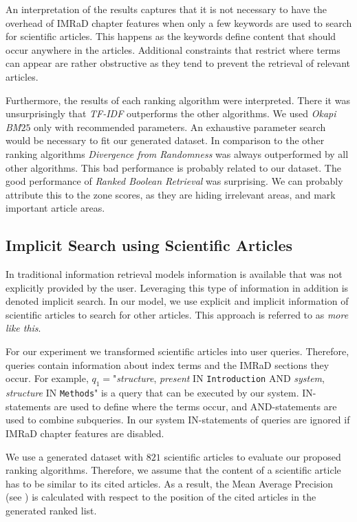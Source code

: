 An interpretation of the results captures that it is not necessary to have the overhead of IMRaD chapter features when only a few keywords are used to search for scientific articles. This happens as the keywords define content that should occur anywhere in the articles. Additional constraints that restrict where terms can appear are rather obstructive as they tend to prevent the retrieval of relevant articles.

Furthermore, the results of each ranking algorithm were interpreted. There it was unsurprisingly that \textit{TF-IDF} outperforms the other algorithms. We used \textit{Okapi BM$25$} only with recommended parameters. An exhaustive parameter search would be necessary to fit our generated dataset. In comparison to the other ranking algorithms \textit{Divergence from Randomness} was always outperformed by all other algorithms. This bad performance is probably related to our dataset. The good performance of \textit{Ranked Boolean Retrieval} was surprising. We can probably attribute this to the zone scores, as they are hiding irrelevant areas, and mark important article areas.


\subsection{Implicit Search using Scientific Articles}
\label{sec:implicit_search_results}

In traditional information retrieval models information is available that was not explicitly provided by the user. Leveraging this type of information in addition is denoted implicit search. In our model, we use explicit and implicit information of scientific articles to search for other articles. This approach is referred to as \textit{more like this}.

For our experiment we transformed scientific articles into user queries. Therefore, queries contain information about index terms and the IMRaD sections they occur. For example, $q_1=$"\textit{structure}, \textit{present} IN \texttt{Introduction} AND \textit{system}, \textit{structure} IN \texttt{Methods}" is a query that can be executed by our system. IN-statements are used to define where the terms occur, and AND-statements are used to combine subqueries. In our system IN-statements of queries are ignored if IMRaD chapter features are disabled.

We use a generated dataset with $821$ scientific articles to evaluate our proposed ranking algorithms. Therefore, we assume that the content of a scientific article has to be similar to its cited articles. As a result, the Mean Average Precision (see ) is calculated with respect to the position of the cited articles in the generated ranked list.

